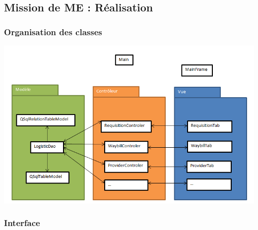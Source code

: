 \subsection{Mission de ME : Réalisation}
	\begin{frame}
		\frametitle{Organisation des classes}
		\begin{center}
			\includegraphics[scale=0.45]{Images/OrganisationClasses}
		\end{center}
	\end{frame}
	\begin{frame}
		\frametitle{Interface}
	\end{frame}